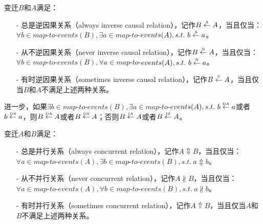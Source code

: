 \begin{definition}[变迁间扩展不确定性精炼逆因果关系]\label{def:exroru_inverse_causal_transition}
变迁$B$和$A$满足：
  \begin{itemize}
    \item[-] 总是逆因果关系（always inverse causal relation），记作$B\overset{\text{\tiny{A}}}{\leftarrow}A$，当且仅当：$\forall b\in map$-$to$-$events(B),\exists a\in map$-$to$-$events(A),s.t.~b\overset{\text{\tiny{A}}}{\leftarrow}a$。
    \item[-] 从不逆因果关系（never inverse causal relation），记作$B\overset{\text{\tiny{N}}}{\leftarrow}A$，当且仅当：$\forall b\in map$-$to$-$events(B),\forall a\in map$-$to$-$events(A),s.t.~b\overset{\text{\tiny{N}}}{\leftarrow}a$。
    \item[-] 有时逆因果关系（sometimes inverse causal relation），记作$B\overset{\text{\tiny{S}}}{\leftarrow}A$，当且仅当$B$和$A$不满足上述两种关系。
  \end{itemize}
进一步，如果$\exists b\in map$-$to$-$events(B),\exists a\in map$-$to$-$events(A),s.t.~b\overset{\text{\tiny{DA}}}{\leftarrow}a$或者$b\overset{\text{\tiny{DS}}}{\leftarrow}a$，则$B\overset{\text{\tiny{DA}}}{\leftarrow}A$或者$B\overset{\text{\tiny{DS}}}{\leftarrow}A$；否则$B\overset{\text{\tiny{IA}}}{\leftarrow}A$或者$B\overset{\text{\tiny{IS}}}{\leftarrow}A$。
\end{definition}

\begin{definition}[变迁间扩展不确定性精炼并行关系]\label{def:exroru_concurrent_transition}
变迁$A$和$B$满足：
  \begin{itemize}
    \item[-] 总是并行关系（always concurrent relation），记作$A\Updownarrow B$，当且仅当：$\forall a\in map$-$to$-$events(A),\exists b\in map$-$to$-$events(B),s.t.~a\Updownarrow b$。
    \item[-] 从不并行关系（never concurrent relation），记作$A\nparallel B$，当且仅当：$\forall a\in map$-$to$-$events(A),\forall b\in map$-$to$-$events(B),s.t.~a\nparallel b$。
    \item[-] 有时并行关系（sometimes concurrent relation），记作$A\Uparrow B$，当且仅当$A$和$B$不满足上述两种关系。
  \end{itemize}
\end{definition}

